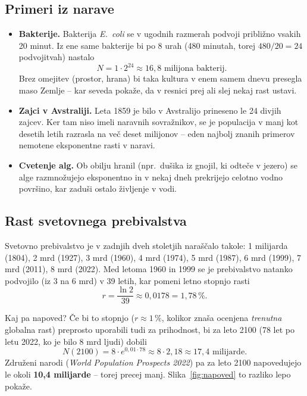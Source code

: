 \documentclass[11pt,a4paper]{article}
\begin{document}
\subsection*{Primeri iz narave}
 
\begin{itemize}
  \item \textbf{Bakterije.} Bakterija \textit{E.\ coli} se v ugodnih razmerah podvoji približno vsakih 20 minut. Iz ene same bakterije bi po 8 urah (480 minutah, torej $480/20=24$ podvojitvah) nastalo
  \[
  N = 1 \cdot 2^{24} \approx 16{,}8 \text{ milijona bakterij.}
  \]
  Brez omejitev (prostor, hrana) bi taka kultura v enem samem dnevu presegla maso Zemlje -- kar seveda pokaže, da v resnici prej ali slej nekaj rast ustavi.
  \item \textbf{Zajci v Avstraliji.} Leta 1859 je bilo v Avstralijo prineseno le 24 divjih zajcev. Ker tam niso imeli naravnih sovražnikov, se je populacija v manj kot desetih letih razrasla na več deset milijonov -- eden najbolj znanih primerov nemotene eksponentne rasti v naravi.
  \item \textbf{Cvetenje alg.} Ob obilju hranil (npr.\ dušika iz gnojil, ki odteče v jezero) se alge razmnožujejo eksponentno in v nekaj dneh prekrijejo celotno vodno površino, kar zaduši ostalo življenje v vodi.
\end{itemize}
 
\subsection*{Rast svetovnega prebivalstva}
 
Svetovno prebivalstvo je v zadnjih dveh stoletjih naraščalo takole: 1 milijarda (1804), 2 mrd (1927), 3 mrd (1960), 4 mrd (1974), 5 mrd (1987), 6 mrd (1999), 7 mrd (2011), 8 mrd (2022). Med letoma 1960 in 1999 se je prebivalstvo natanko podvojilo (iz 3 na 6 mrd) v 39 letih, kar pomeni letno stopnjo rasti
\[
r = \frac{\ln 2}{39} \approx 0{,}0178 = 1{,}78\,\%.
\]
 
Kaj pa napoved? Če bi to stopnjo ($r\approx 1\,\%$, kolikor znaša ocenjena \emph{trenutna} globalna rast) preprosto uporabili tudi za prihodnost, bi za leto 2100 (78 let po letu 2022, ko je bilo 8 mrd ljudi) dobili
\[
N(2100) = 8 \cdot e^{0{,}01 \cdot 78} \approx 8 \cdot 2{,}18 \approx 17{,}4 \text{ milijarde}.
\]
Združeni narodi (\textit{World Population Prospects 2022}) pa za leto 2100 napovedujejo le okoli \textbf{10,4 milijarde} -- torej precej manj. Slika~\ref{fig:napoved} to razliko lepo pokaže.
 
\end{document}
